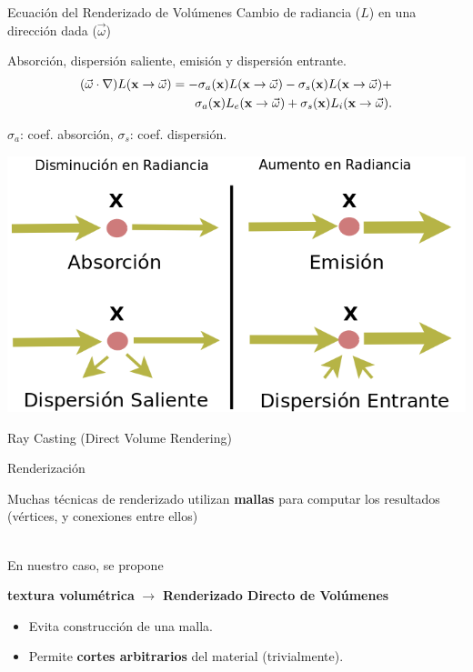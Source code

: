 \documentclass[spanish,unknownkeysallowed,10pt]{beamer}
\begin{document}
\begin{frame}{Ecuación del Renderizado de Volúmenes}
Cambio de radiancia ($L$) en una dirección dada ($\vec{\omega}$) 

Absorción, dispersión saliente, emisión y dispersión entrante.
\begin{equation*}
\begin{aligned}
(\vec{\omega} \cdot \nabla) L(\bold{x} \rightarrow \vec{\omega}) = - \sigma_{a}(\bold{x}) L(\bold{x} \rightarrow \vec{\omega}) - \sigma_{s}(\bold{x}) L(\bold{x} \rightarrow \vec{\omega}) + \\
\sigma_{a}(\bold{x}) L_{e}(\bold{x} \rightarrow \vec{\omega}) + \sigma_{s}(\bold{x}) L_{i}(\bold{x} \rightarrow \vec{\omega}).
\end{aligned}
\end{equation*}

$\sigma_{a}$: coef. absorción, $\sigma_{s}$: coef. dispersión.


\centering
\includegraphics[scale = 0.3]{../figures/fenomenosrte}

Ray Casting (Direct Volume Rendering)
\end{frame}



\begin{frame}{Renderización}

Muchas técnicas de renderizado utilizan \textbf{mallas} para computar los resultados (vértices, y conexiones entre ellos)

\ \\

En nuestro caso, se propone

\textbf{textura volumétrica} $\rightarrow$ \textbf{Renderizado Directo de Volúmenes}

\begin{itemize}
\item Evita construcción de una malla.
\item Permite \textbf{cortes arbitrarios} del material (trivialmente).
\end{itemize}

\end{frame}
\end{document}
